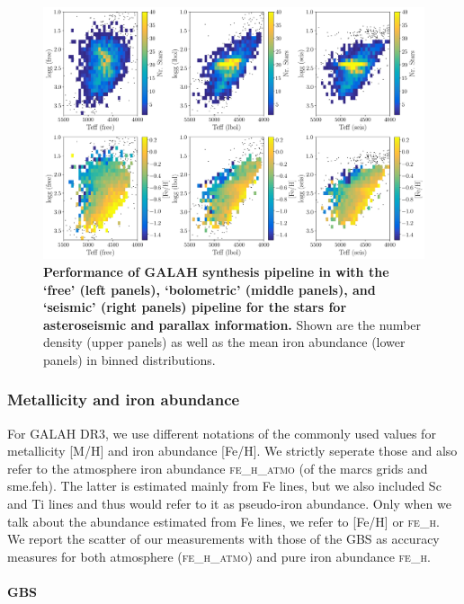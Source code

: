 \documentclass[fleqn,usenatbib,useAMS]{mnras}
\begin{document}
\begin{figure}
\centering
\includegraphics[width=\textwidth]{figures/seis_comparison_3setups.png}
\caption{
\textbf{Performance of GALAH synthesis pipeline in with the `free' (left panels), `bolometric' (middle panels), and `seismic' (right panels) pipeline for the stars for asteroseismic and parallax information.}
Shown are the number density (upper panels) as well as the mean iron abundance (lower panels) in binned distributions.
}
\label{fig:seis_comparison_3setups}
\end{figure}

\subsubsection{Metallicity and iron abundance}

For GALAH DR3, we use different notations of the commonly used values for metallicity [M/H] and iron abundance [Fe/H]. We strictly seperate those and also refer to the atmosphere iron abundance \textsc{fe\_h\_atmo} (of the {\sc marcs} grids and {\sc sme}.feh). The latter is estimated mainly from Fe lines, but we also included Sc and Ti lines and thus would refer to it as pseudo-iron abundance. Only when we talk about the abundance estimated from Fe lines, we refer to [Fe/H] or \textsc{fe\_h}. We report the scatter of our measurements with those of the GBS as accuracy measures for both atmosphere (\textsc{fe\_h\_atmo}) and pure iron abundance \textsc{fe\_h}.

\paragraph*{GBS}
\end{document}
